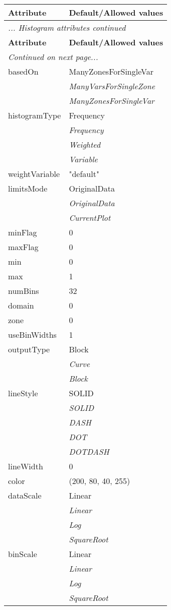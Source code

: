 \documentclass[10pt,a4paper]{report}
\begin{document}
\begin{longtable}{ll}
{\bf Attribute} & {\bf Default/Allowed values} \\
\hline \hline
\endfirsthead
\multicolumn{2}{l}{{\it ... Histogram attributes continued}} \\
{\bf Attribute} & {\bf Default/Allowed values} \\
\hline \hline
\endhead
\hline
\multicolumn{2}{l}{{\it Continued on next page...}} \\
\endfoot
\hline
\endlastfoot

basedOn  &  ManyZonesForSingleVar   \\
 & {\it  ManyVarsForSingleZone} \\
 & {\it  ManyZonesForSingleVar} \\
histogramType  &  Frequency   \\
 & {\it  Frequency} \\
 & {\it  Weighted} \\
 & {\it  Variable} \\
weightVariable  &  "default" \\
limitsMode  &  OriginalData   \\
 & {\it  OriginalData} \\
 & {\it  CurrentPlot} \\
minFlag  &  0 \\
maxFlag  &  0 \\
min  &  0 \\
max  &  1 \\
numBins  &  32 \\
domain  &  0 \\
zone  &  0 \\
useBinWidths  &  1 \\
outputType  &  Block   \\
 & {\it  Curve} \\
 & {\it  Block} \\
lineStyle  &  SOLID   \\
 & {\it  SOLID} \\
 & {\it  DASH} \\
 & {\it  DOT} \\
 & {\it  DOTDASH} \\
lineWidth  &  0 \\
color  &  (200, 80, 40, 255) \\
dataScale  &  Linear   \\
 & {\it  Linear} \\
 & {\it  Log} \\
 & {\it  SquareRoot} \\
binScale  &  Linear   \\
 & {\it  Linear} \\
 & {\it  Log} \\
 & {\it  SquareRoot} \\
\end{longtable}
\end{document}
